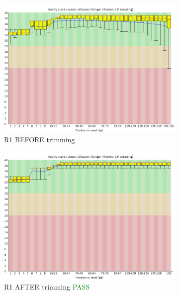 \documentclass{article}
\begin{document}
\begin{figure}[!htb]
\caption{Per base sequence quality}
\centering
\begin{subfigure}{0.45\linewidth}
\includegraphics[width=\linewidth]{04-D15-22373-HT-Nextera-Myeloid-Val1-Repeat_S4_L001_R1_001_fastqc/Images/per_base_quality.png}
\caption{R1 BEFORE trimming}
\end{subfigure}
\begin{subfigure}{0.45\linewidth}
\includegraphics[width=\linewidth]{04-D15-22373-HT-Nextera-Myeloid-Val1-Repeat_S4_L001_R1_001.qfilter_fastqc/Images/per_base_quality.png}
\caption{R1 AFTER trimming \textcolor{green}{PASS}}
\end{subfigure}
\begin{subfigure}{0.45\linewidth}

\end{subfigure}
\end{figure}
\end{document}
